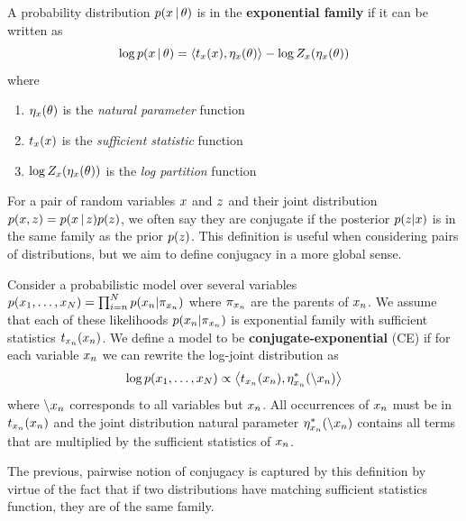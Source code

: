 \begin{definition}
A probability distribution $p(x \,|\, \theta)$ is in the \textbf{exponential family}
if it can be written as
\begin{equation}
    \log p(x \,|\, \theta) = \left\langle t_x(x),\eta_x(\theta)\right\rangle - \log Z_x(\eta_x(\theta))
\end{equation}
where
\begin{enumerate}
    \item $\eta_x(\theta)$ is the \emph{natural parameter} function
    \item $t_x(x)$ is the \emph{sufficient statistic} function
    \item $\log Z_x(\eta_x(\theta))$ is the \emph{log partition} function
\end{enumerate}
\end{definition}


For a pair of random variables $x$ and $z$ and their
joint distribution $p(x, z) = p(x \,|\, z)p(z)$, we often say
they are conjugate if the posterior $p(z|x)$ is in the same
family as the prior $p(z)$. This definition
is useful when considering pairs of distributions,
but we aim to define conjugacy in a more global sense.

\begin{definition}
\label{def:conjugacy}
Consider a probabilistic model over several variables $p(x_1, \ldots, x_N) = \prod_{i = n}^N p(x_n | \pi_{x_n})$ where $\pi_{x_n}$ are the parents of $x_n$.
We assume that each of these likelihoods $p(x_n | \pi_{x_n})$
is exponential family with sufficient statistics $t_{x_n}(x_n)$.
We define a model to be \textbf{conjugate-exponential} (CE)
if for each variable $x_n$ we can rewrite
the log-joint distribution as
\begin{equation}\label{eq:natparam}
    \log p(x_1, \ldots, x_N) \propto \left\langle t_{x_n}(x_n), \eta^*_{x_n}(\backslash x_n)\right\rangle
\end{equation}
where $\backslash x_n$ corresponds to all variables but $x_n$.
All occurrences of $x_n$ must be in $t_{x_n}(x_n)$ and the
joint distribution natural parameter $\eta^*_{x_n}(\backslash x_n)$
contains all terms that are multiplied by the sufficient statistics of $x_n$.
\end{definition}
The previous, pairwise notion of conjugacy is captured by this definition 
by virtue of the fact that if two distributions
have matching sufficient statistics function, they are of the same family.

